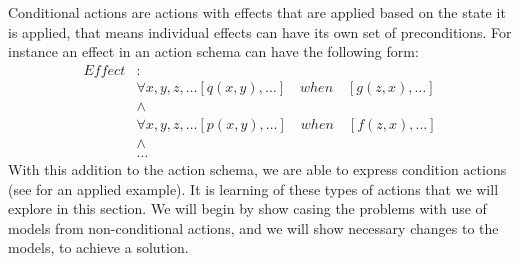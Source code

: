 \documentclass[../Master.tex]{subfiles}
\begin{document}
Conditional actions are actions with effects that are applied based on the state it is applied, that means individual effects can have its own set of preconditions.
For instance an effect in an action schema can have the following form:
\begin{align*}
Effect&:\\
&\forall x, y, z, \dots \left[ q(x, y), \dots \right] \quad when \quad 
\left[ g(z, x), \dots  \right] \\
& \land \\
& \forall x, y, z, \dots \left[ p(x, y), \dots \right] \quad when \quad 
\left[ f(z, x), \dots  \right] \\
&\land \\ 
&\dots
\end{align*}
With this addition to the action schema, we are able to express condition actions (see  for an applied example). 
It is learning of these types of actions that we will explore in this section. 
We will begin by show casing the problems with use of models from non-conditional actions, and we will show necessary changes to the models, to achieve a solution.
\end{document}
